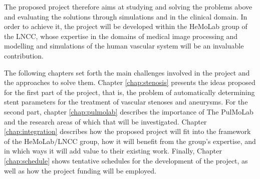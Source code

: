 The proposed project therefore aims at studying and solving the problems above and evaluating the solutions through simulations and in the clinical domain. In order to achieve it, the project will be developed within the HeMoLab group of the LNCC, whose expertise in the domains of medical image processing and modelling and simulations of the human vascular system will be an invaluable contribution.

The following chapters set forth the main challenges involved in the project and the approaches to solve them. Chapter \ref{chap:stenosis} presents the ideas proposed for the first part of the project, that is, the problem of automatically determining stent parameters for the treatment of vascular stenoses and aneurysms. For the second part, chapter \ref{chap:pulmolab} describes the importance of The PulMoLab and the research areas of which that will be investigated. Chapter \ref{chap:integration} describes how the proposed project will fit into the framework of the HeMoLab/LNCC group, how it will benefit from the group's expertise, and in which ways it will add value to their existing work. Finally, Chapter \ref{chap:schedule} shows tentative schedules for the development of the project, as well as how the project funding will be employed.



